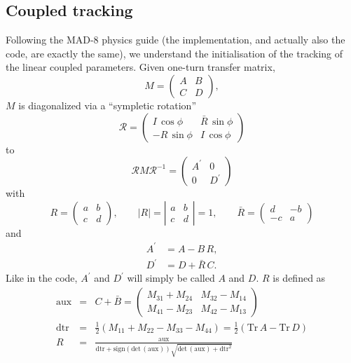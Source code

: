 \documentclass{cern-art} %
\begin{document}
\subsection{Coupled tracking}
Following the MAD-8 physics guide (the implementation, and actually also the code, are exactly the same), we understand the initialisation of the tracking of the linear coupled parameters. Given one-turn transfer matrix,
$$M=\left(\begin{array}{cc}
A & B\\
C & D
\end{array}\right),$$
$M$ is diagonalized via a ``sympletic rotation'' $$\mathcal{R}=\left(\begin{array}{cc}
I\,\cos\phi & \bar{R}\,\sin\phi\\
-R\,\sin\phi & I\,\cos\phi
\end{array}\right)$$
to
$$\mathcal{R}M\mathcal{R}^{-1}=\left(\begin{array}{cc}
A^{\prime} & 0\\
0 & D^{\prime}
\end{array}\right)$$
with
$$R=\left(\begin{array}{cc}
a & b\\
c & d
\end{array}\right),\qquad\left|R\right|=\left|\begin{array}{cc}
a & b\\
c & d
\end{array}\right|=1,\qquad\bar{R}=\left(\begin{array}{cc}
d & -b\\
-c & a
\end{array}\right)
$$
and
$$\begin{aligned}A^{\prime} & =A-B\, R,\\
D^{\prime} & =D+\bar{R}\, C.
\end{aligned}$$
Like in the code, $A^{\prime}$ and $D^{\prime}$ will simply be called $A$ and $D$. $R$ is defined as
\begin{eqnarray*}
\text{aux} & = & C+\bar{B}=\left(\begin{array}{cc}
M_{31}+M_{24} & M_{32}-M_{14}\\
M_{41}-M_{23} & M_{42}-M_{13}
\end{array}\right)\\
\text{dtr} & = & \frac{1}{2}\left(M_{11}+M_{22}-M_{33}-M_{44}\right)=\frac{1}{2}\left(\mathrm{Tr}\, A-\mathrm{Tr}\, D\right)\\
R & = & \frac{\text{aux}}{\text{dtr}+\mathrm{sign}\left(\mathrm{det}\,\left(\text{aux}\right)\right)\sqrt{\mathrm{det}\,\left(\text{aux}\right)+\text{dtr}^{2}}}
\end{eqnarray*}
\end{document}
